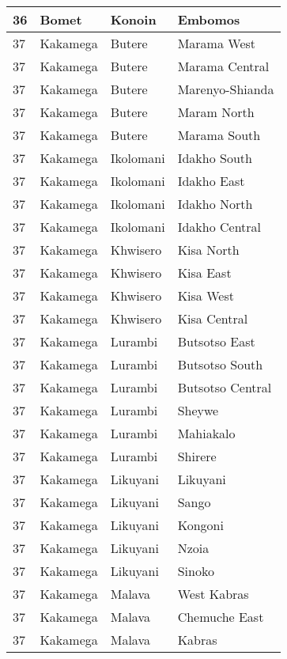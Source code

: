 \begin{table}[!ht]
\begin{tabular}{|l|l|l|l|}
        36 & Bomet & Konoin & Embomos \\ \hline
        37 & Kakamega & Butere & Marama West \\ \hline
        37 & Kakamega & Butere & Marama Central \\ \hline
        37 & Kakamega & Butere & Marenyo-Shianda \\ \hline
        37 & Kakamega & Butere & Maram North \\ \hline
        37 & Kakamega & Butere & Marama South \\ \hline
        37 & Kakamega & Ikolomani & Idakho South \\ \hline
        37 & Kakamega & Ikolomani & Idakho East \\ \hline
        37 & Kakamega & Ikolomani & Idakho North \\ \hline
        37 & Kakamega & Ikolomani & Idakho Central \\ \hline
        37 & Kakamega & Khwisero & Kisa North \\ \hline
        37 & Kakamega & Khwisero & Kisa East \\ \hline
        37 & Kakamega & Khwisero & Kisa West \\ \hline
        37 & Kakamega & Khwisero & Kisa Central \\ \hline
        37 & Kakamega & Lurambi & Butsotso East \\ \hline
        37 & Kakamega & Lurambi & Butsotso South \\ \hline
        37 & Kakamega & Lurambi & Butsotso Central \\ \hline
        37 & Kakamega & Lurambi & Sheywe \\ \hline
        37 & Kakamega & Lurambi & Mahiakalo \\ \hline
        37 & Kakamega & Lurambi & Shirere \\ \hline
        37 & Kakamega & Likuyani & Likuyani \\ \hline
        37 & Kakamega & Likuyani & Sango \\ \hline
        37 & Kakamega & Likuyani & Kongoni \\ \hline
        37 & Kakamega & Likuyani & Nzoia \\ \hline
        37 & Kakamega & Likuyani & Sinoko \\ \hline
        37 & Kakamega & Malava & West Kabras \\ \hline
        37 & Kakamega & Malava & Chemuche East \\ \hline
        37 & Kakamega & Malava & Kabras \\ \hline

\end{tabular}
\end{table}
